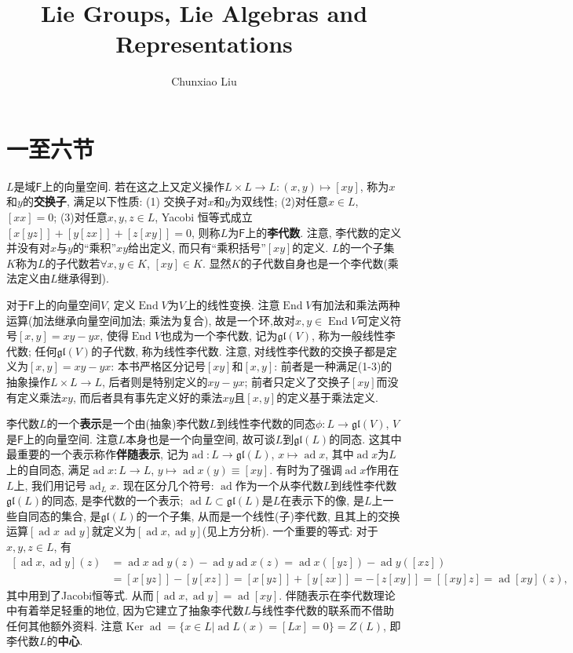\documentclass{ctexart}%
\theoremstyle{definition}
\theoremstyle{remark}
\DeclareMathOperator{\ad}{ad}
\DeclareMathOperator{\End}{End}
\DeclareMathOperator{\Ker}{Ker}
\begin{document}
\title{Lie Groups, Lie Algebras and Representations}

\author{Chunxiao Liu}

\maketitle



\section{一至六节}

$L$是域$\mathsf{F}$上的向量空间. 若在这之上又定义操作$L\times L\rightarrow L\colon (x,y)\mapsto [xy]$, 称为$x$和$y$的\textbf{交换子}, 满足以下性质: (1) 交换子对$x$和$y$为双线性; (2)对任意$x\in L$, $[xx]=0$; (3)对任意$x,y,z\in L$, Yacobi 恒等式成立$[x[yz]]+[y[zx]]+[z[xy]]=0$, 则称$L$为$\mathsf{F}$上的\textbf{李代数}. 注意, 李代数的定义并没有对$x$与$y$的``乘积''\;$xy$给出定义, 而只有``乘积括号''\;$[xy]$的定义. $L$的一个子集$K$称为$L$的子代数若$\forall x,y\in K$, $[xy]\in K$. 显然$K$的子代数自身也是一个李代数(乘法定义由$L$继承得到).

对于$\mathsf{F}$上的向量空间$V$, 定义$\End V$为$V$上的线性变换. 注意$\End V$有加法和乘法两种运算(加法继承向量空间加法; 乘法为复合), 故是一个环,故对$x,y\in \End V$可定义符号$[x,y]=xy-yx$, 使得$\End V$也成为一个李代数, 记为$\mathfrak{gl}(V)$, 称为一般线性李代数; 任何$\mathfrak{gl}(V)$的子代数, 称为线性李代数. 注意, 对线性李代数的交换子都是定义为$[x,y]=xy-yx$: 本书严格区分记号$[xy]$和$[x,y]$: 前者是一种满足(1-3)的抽象操作$L\times L\rightarrow L$, 后者则是特别定义的$xy-yx$; 前者只定义了交换子$[xy]$而没有定义乘法$xy$, 而后者具有事先定义好的乘法$xy$且$[x,y]$的定义基于乘法定义.

李代数$L$的一个\textbf{表示}是一个由(抽象)李代数$L$到线性李代数的同态$\phi\colon L\rightarrow \mathfrak{gl}(V)$, $V$是$\mathsf{F}$上的向量空间. 注意$L$本身也是一个向量空间, 故可谈$L$到$\mathfrak{gl}(L)$的同态. 这其中最重要的一个表示称作\textbf{伴随表示}, 记为$\ad \colon L\rightarrow \mathfrak{gl}(L)$, $x\mapsto \ad x$, 其中$\ad x$为$L$上的自同态, 满足$\ad x\colon L\rightarrow L$, $y\mapsto \ad x(y)\equiv[xy]$. 有时为了强调$\ad x$作用在$L$上, 我们用记号$\ad_L x$. 现在区分几个符号: $\ad$作为一个从李代数$L$到线性李代数$\mathfrak{gl}(L)$的同态, 是李代数的一个表示; $\ad L\subset \mathfrak{gl}(L)$是$L$在表示下的像, 是$L$上一些自同态的集合, 是$\mathfrak{gl}(L)$的一个子集, 从而是一个线性(子)李代数, 且其上的交换运算$[\ad x\,\ad y]$就定义为$[\ad x,\ad y]$(见上方分析). 一个重要的等式: 对于$x,y,z\in L$, 有
\begin{equation}\label{xy}
\begin{aligned}
{}[\ad x,\ad y](z) &= \ad  x \ad  y(z)-\ad  y \ad  x(z)
= \ad  x([yz])-\ad  y([xz])\\
&= [x[yz]]-[y[xz]]=[x[yz]]+[y[zx]]=-[z[xy]]=[[xy]z]=\ad  [xy] (z),
\end{aligned}
\end{equation}
其中用到了Jacobi恒等式. 从而$[\ad x,\ad y]=\ad  [xy]$. 伴随表示在李代数理论中有着举足轻重的地位, 因为它建立了抽象李代数$L$与线性李代数的联系而不借助任何其他额外资料. 注意$\Ker \ad = \{x\in L|\ad L(x)=[Lx]=0\}= Z(L)$, 即李代数$L$的\textbf{中心}. 
\end{document}
